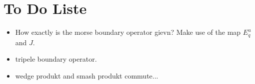 \section{To Do Liste}
\begin{itemize}
	\item How exactly is the morse boundary operator gievn? Make use of the map $E^u_q$ and $J$.
	\item tripele boundary operator.
	\item wedge produkt and smash produkt commute...
\end{itemize}
